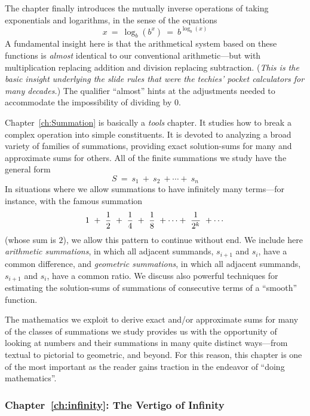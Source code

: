 The chapter finally introduces the mutually inverse operations of
taking exponentials and logarithms, in the sense of the equations
\[  x \ = \ \log_b(b^x) \ = \ b^{\log_b(x)} \]
A fundamental insight here is that the arithmetical system based on
these functions is {\em almost} identical to our conventional
arithmetic---but with multiplication replacing addition and division
replacing subtraction.  ({\em This is the basic insight underlying the
  {\em slide rules} that were the techies' pocket calculators for many
  decades.})  The qualifier ``almost'' hints at the adjustments needed
to accommodate the impossibility of dividing by $0$.

\bigskip

Chapter~\ref{ch:Summation} is basically a {\em tools} chapter. 
It studies how to break a complex operation into simple constituents.
It is devoted to analyzing a broad variety of families of summations,
providing exact solution-sums for many and approximate sums for
others.  All of the finite summations we study have the general form
\[ S \ = \ s_1 \ + \ s_2 \ + \cdots + \ s_n \]
In situations where we allow summations to have infinitely many
terms---for instance, with the famous summation
\[ 1 \ + \ {1 \over 2} \ + \ {1 \over 4} \ + \ {1 \over 8} \ + \cdots
+ \ {1 \over {2^k}} \ + \cdots
\]
(whose sum is $2$), we allow this pattern to continue without end.  We
include here {\it arithmetic summations}, in which all adjacent
summands, $s_{i+1}$ and $s_i$, have a common difference, and {\it
  geometric summations}, in which all adjacent summands, $s_{i+1}$ and
$s_i$, have a common ratio.  We discuss also powerful techniques for
estimating the solution-sums of summations of consecutive terms of a
``smooth'' function.

The mathematics we exploit to derive exact and/or approximate sums for
many of the classes of summations we study provides us with the
opportunity of looking at numbers and their summations in many quite
distinct ways---from textual to pictorial to geometric, and beyond.
For this reason, this chapter is one of the most important as the
reader gains traction in the endeavor of ``doing mathematics''.

\subsubsection{Chapter~\ref{ch:infinity}: The Vertigo of Infinity}

